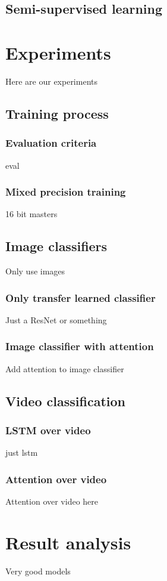 \section{Semi-supervised learning}


\chapter{Experiments}
Here are our experiments
\section{Training process}
\subsection{Evaluation criteria}
eval
\subsection{Mixed precision training}
16 bit  masters
\section{Image classifiers}
Only use images
\subsection{Only transfer learned classifier}
Just a ResNet or something
\subsection{Image classifier with attention}
Add attention to image classifier
\section{Video classification}
\subsection{LSTM over video}
just lstm
\subsection{Attention over video}
Attention over video here

\chapter{Result analysis}
Very good models

